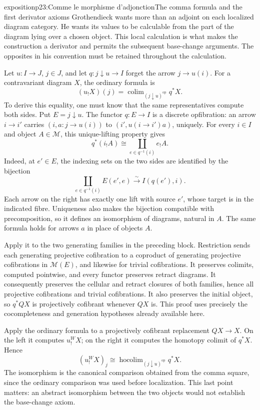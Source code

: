 \begin{dcomment}{exposition}{p23:Comme le morphisme d'adjonction}{The comma formula and the first derivator axioms}
Grothendieck wants more than an adjoint on each localized diagram category. He wants its values to be calculable from the part of the diagram lying over a chosen object. This local calculation is what makes the construction a derivator and permits the subsequent base-change arguments. The opposites in his convention must be retained throughout the calculation.

Let $u:I\to J$, $j\in J$, and let $q:j\downarrow u\to I$ forget the arrow $j\to u(i)$. For a contravariant diagram $X$, the ordinary formula is
\[
 (u_!X)(j)=\operatorname{colim}_{(j\downarrow u)^{\mathrm{op}}}q^*X.
\]
To derive this equality, one must know that the same representatives compute both sides. Put $E=j\downarrow u$. The functor $q:E\to I$ is a discrete opfibration: an arrow $i\to i'$ carries $(i,a:j\to u(i))$ to $(i',u(i\to i')a)$, uniquely. For every $i\in I$ and object $A\in\mathcal M$, this unique-lifting property gives
\[
 q^*(i_!A)\cong\coprod_{e\in q^{-1}(i)} e_!A.
\]
Indeed, at $e'\in E$, the indexing sets on the two sides are identified by the bijection
\[
 \coprod_{e\in q^{-1}(i)} E(e',e)
       \xrightarrow{\ \sim\ } I(q(e'),i).
\]
Each arrow on the right has exactly one lift with source $e'$, whose target is in the indicated fibre. Uniqueness also makes the bijection compatible with precomposition, so it defines an isomorphism of diagrams, natural in $A$. The same formula holds for arrows $a$ in place of objects $A$.

Apply it to the two generating families in the preceding block. Restriction sends each generating projective cofibration to a coproduct of generating projective cofibrations in $\mathcal M(E)$, and likewise for trivial cofibrations. It preserves colimits, computed pointwise, and every functor preserves retract diagrams. It consequently preserves the cellular and retract closures of both families, hence all projective cofibrations and trivial cofibrations. It also preserves the initial object, so $q^*QX$ is projectively cofibrant whenever $QX$ is. This proof uses precisely the cocompleteness and generation hypotheses already available here.

Apply the ordinary formula to a projectively cofibrant replacement $QX\to X$. On the left it computes $u_!^WX$; on the right it computes the homotopy colimit of $q^*X$. Hence
\[
 (u_!^WX)_j\cong
 \operatorname{hocolim}_{(j\downarrow u)^{\mathrm{op}}}q^*X.
\]
The isomorphism is the canonical comparison obtained from the comma square, since the ordinary comparison was used before localization. This last point matters: an abstract isomorphism between the two objects would not establish the base-change axiom.


\end{dcomment}
